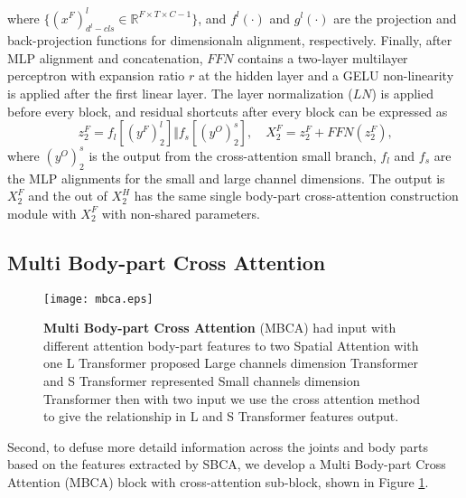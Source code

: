 \documentclass{bmvc2k}
\begin{document}
where $\{{(x^{F})}^{l}_{d^{l} - cls}\in\mathbb{R}^{F\times T\times C-1}\}$, and $f^{l}(\cdot)$ and $g^{l}(\cdot)$ are the projection and back-projection functions for dimensionaln alignment, respectively. Finally, after MLP alignment and concatenation, $FFN$ contains a two-layer multilayer perceptron with expansion ratio $r$ at the hidden layer and a GELU non-linearity is applied after the first linear layer. The layer normalization ($LN$) is applied before every block, and residual shortcuts after every block can be expressed as
\begin{equation}
z^{F}_{2}=f_{l}[(y^{F})^{l}_{2}] \Vert f_{s}[({y}^{O})^{s}_{2}],\quad
{X}^{F}_{2}={z}^{F}_{2}+\mathit{FFN}({z}^{F}_{2}) \text{,}
\end{equation}
where $(y^{O})^{s}_{2}$ is the output from the cross-attention small branch, $f_{l}$ and $f_{s}$ are the MLP alignments for the small and large channel dimensions.
The output is ${X}^{F}_{2}$ and the out of ${X}^{H}_{2}$ has the same single body-part cross-attention construction module with ${X}^{F}_{2}$ with non-shared parameters.



\subsection{Multi Body-part Cross Attention}

\begin{figure}[t]
\begin{center}
   \texttt{[image: mbca.eps]}
\end{center}
   \caption{\textbf{Multi Body-part Cross Attention} (MBCA) had input with different attention body-part features to two Spatial Attention with one L Transformer proposed Large channels dimension Transformer and S Transformer represented Small channels dimension Transformer then with two input we use the cross attention method to give the relationship in L and S Transformer features output.}
\label{fig-mbca}
\end{figure}

Second, to defuse more detaild information across the joints and body parts based on the features extracted by SBCA, we develop a Multi Body-part Cross Attention (MBCA) block with cross-attention sub-block, shown in Figure \ref{fig-mbca}.
\end{document}
